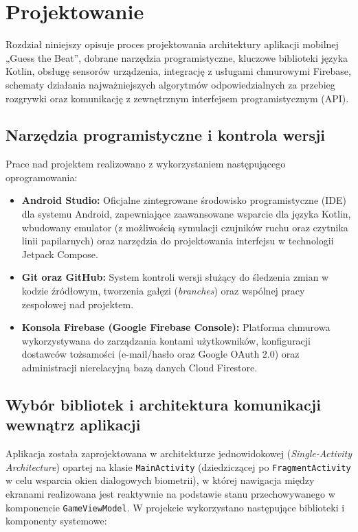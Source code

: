 \section{Projektowanie}		%

\hspace{0.60cm}Rozdział niniejszy opisuje proces projektowania architektury aplikacji mobilnej „Guess the Beat”, dobrane narzędzia programistyczne, kluczowe biblioteki języka Kotlin, obsługę sensorów urządzenia, integrację z usługami chmurowymi Firebase, schematy działania najważniejszych algorytmów odpowiedzialnych za przebieg rozgrywki oraz komunikację z zewnętrznym interfejsem programistycznym (API).

\subsection{Narzędzia programistyczne i kontrola wersji}

\hspace{0.60cm}Prace nad projektem realizowano z wykorzystaniem następującego oprogramowania:
\begin{itemize}
    \item \textbf{Android Studio:} Oficjalne zintegrowane środowisko programistyczne (IDE) dla systemu Android, zapewniające zaawansowane wsparcie dla języka Kotlin, wbudowany emulator (z możliwością symulacji czujników ruchu oraz czytnika linii papilarnych) oraz narzędzia do projektowania interfejsu w technologii Jetpack Compose.
    \item \textbf{Git oraz GitHub:} System kontroli wersji służący do śledzenia zmian w kodzie źródłowym, tworzenia gałęzi (\textit{branches}) oraz wspólnej pracy zespołowej nad projektem.
    \item \textbf{Konsola Firebase (Google Firebase Console):} Platforma chmurowa wykorzystywana do zarządzania kontami użytkowników, konfiguracji dostawców tożsamości (e-mail/hasło oraz Google OAuth 2.0) oraz administracji nierelacyjną bazą danych Cloud Firestore.
\end{itemize}

\subsection{Wybór bibliotek i architektura komunikacji wewnątrz aplikacji}

\hspace{0.60cm}Aplikacja została zaprojektowana w architekturze jednowidokowej (\textit{Single-Activity Architecture}) opartej na klasie \texttt{MainActivity} (dziedziczącej po \texttt{FragmentActivity} w celu wsparcia okien dialogowych biometrii), w której nawigacja między ekranami realizowana jest reaktywnie na podstawie stanu przechowywanego w komponencie \texttt{GameViewModel}. W projekcie wykorzystano następujące biblioteki i komponenty systemowe:

